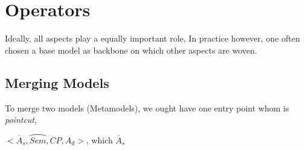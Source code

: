 \section{Operators}
Ideally, all aspects play a equally important role, In practice however, one often chosen a base model as backbone on which other aspects are woven.  
\subsection{Merging Models}
To merge two models (Metamodels), we ought have one entry point whom is \textit{pointcut},  

$<\mathring{A_s}, \wideparen{Sem}, CP, A_d>$, which $\mathring{A_s}$